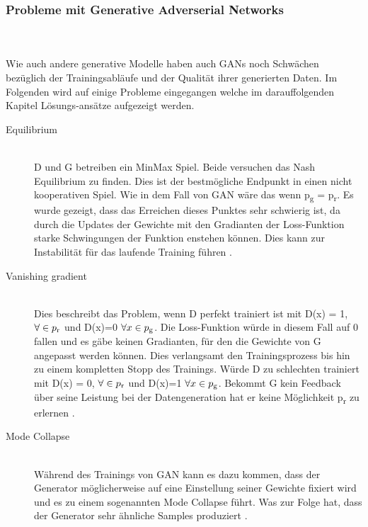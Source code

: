 \documentclass{llncs}
\begin{document}
\subsubsection{Probleme mit Generative Adverserial Networks}\label{sec:problemegan}
~\\\\
Wie auch andere generative Modelle haben auch GANs noch Schwächen bezüglich der Trainingsabläufe und der Qualität ihrer generierten Daten. Im Folgenden wird auf einige Probleme eingegangen welche im darauffolgenden Kapitel Lösungs-ansätze aufgezeigt werden. 
\\
\begin{description}	

\item[Equilibrium]
~\\
D und G betreiben ein MinMax Spiel. Beide versuchen das Nash Equilibrium zu finden. Dies ist der bestmögliche Endpunkt in einen nicht kooperativen Spiel. Wie in dem Fall von GAN wäre das wenn  p\textsubscript{g} = p\textsubscript{r}. Es wurde gezeigt, dass das Erreichen dieses Punktes sehr schwierig ist, da durch die Updates der Gewichte mit den Gradianten der Loss-Funktion starke Schwingungen der Funktion enstehen können. Dies kann zur Instabilität für das laufende Training führen \cite{improvingan}.   
\\
\item[Vanishing gradient]
~\\
Dies beschreibt das Problem, wenn D perfekt trainiert ist mit  D(x) = 1, $\forall \in p\textsubscript{r}$ und D(x)=0 $\forall x \in p \textsubscript{g}$. Die Loss-Funktion würde in diesem Fall auf 0 fallen und es gäbe keinen Gradianten, für den die Gewichte von G angepasst werden können. Dies verlangsamt den Trainingsprozess bis hin zu einem kompletten Stopp des Trainings. Würde D zu schlechten trainiert mit  D(x) = 0, $\forall \in p\textsubscript{r}$ und D(x)=1 $\forall x \in p \textsubscript{g}$. Bekommt G kein Feedback über seine Leistung bei der Datengeneration hat er keine Möglichkeit p\textsubscript{r} zu erlernen \cite{wasser}.
\\
\item[Mode Collapse]
~\\
Während des Trainings von GAN kann es dazu kommen, dass der Generator möglicherweise auf eine Einstellung seiner Gewichte fixiert wird und es zu einem sogenannten Mode Collapse führt. Was zur Folge hat, dass der Generator sehr ähnliche Samples produziert \cite{wasser}.
\end{description}
\end{document}
